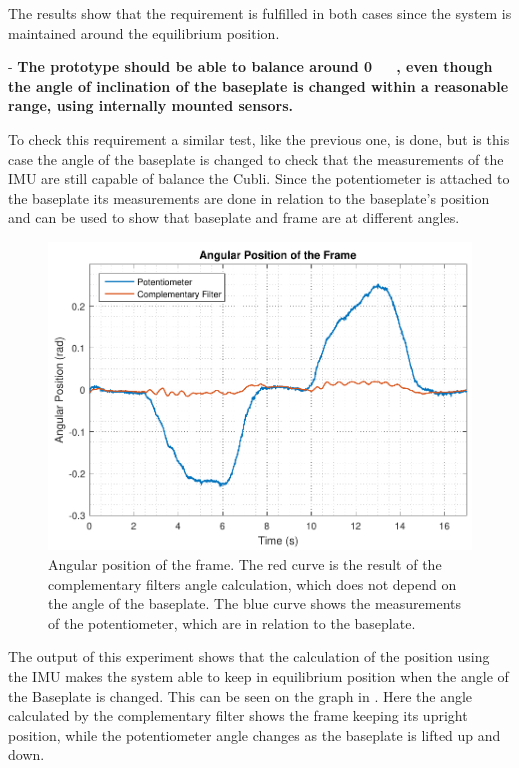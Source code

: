The results show that the requirement is fulfilled in both cases since the system is maintained around the equilibrium position.

- \textbf{The prototype should be able to balance around \si{0\ \rad}, even though the angle of inclination of the baseplate is changed within a reasonable range, using internally mounted sensors.}

To check this requirement a similar test, like the previous one, is done, but is this case the angle of the baseplate is changed to check that the measurements of the IMU are still capable of balance the Cubli. Since the potentiometer is attached to the baseplate its measurements are done in relation to the baseplate's position and can be used to show that baseplate and frame are at different angles.
\begin{figure}[H]
	\centering
	\includegraphics[scale=0.62]{figures/testReq2}
	\caption{Angular position of the frame. The red curve is the result of the complementary filters angle calculation, which does not depend on the angle of the baseplate. The blue curve shows the measurements of the potentiometer, which are in relation to the baseplate.}
	\label{testReq2}
\end{figure}\vspace{-5mm}
%
The output of this experiment shows that the calculation of the position using the IMU makes the system able to keep in equilibrium position when the angle of the Baseplate is changed. This can be seen on the graph in . Here the angle calculated by the complementary filter shows the frame keeping its upright position, while the potentiometer angle changes as the baseplate is lifted up and down. 

